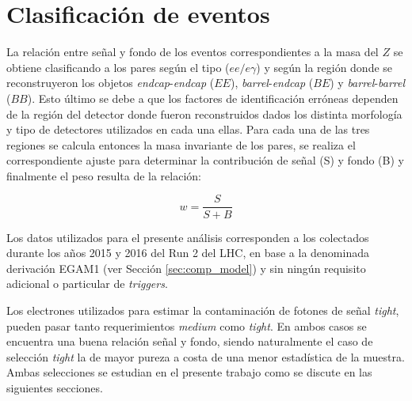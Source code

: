 

\section{Clasificación de eventos}

La relación entre señal y fondo de los eventos correspondientes a la masa del $Z$ se obtiene clasificando a los pares según el tipo ($ee/e\gamma$) y según la región donde se reconstruyeron los objetos \textit{endcap}-\textit{endcap} ($EE$), \textit{barrel}-\textit{endcap} ($BE$) y \textit{barrel}-\textit{barrel} ($BB$). Esto último se debe a que los factores de identificación erróneas dependen de la región del detector donde fueron reconstruidos dados los distinta morfología y tipo de detectores utilizados en cada una ellas. Para cada una de las tres regiones se calcula entonces la masa invariante de los pares, se realiza el correspondiente ajuste para determinar la contribución de señal (S) y fondo (B) y finalmente el peso resulta de la relación:

\begin{equation}
w=\frac{S}{S+B}
\label{eq:peso}
\end{equation}

Los datos utilizados para el presente análisis corresponden a los colectados durante los años 2015 y 2016 del Run 2 del LHC, en base a la denominada derivación EGAM1 (ver Sección \ref{sec:comp_model}) y sin ningún requisito adicional o particular de \textit{triggers}.

Los electrones utilizados para estimar la contaminación de fotones de señal \textit{tight}, pueden pasar tanto requerimientos  \textit{medium} como \textit{tight}. En ambos casos se encuentra una buena relación señal y fondo, siendo naturalmente el caso de selección \textit{tight} la de mayor pureza a costa de una menor estadística de la muestra. Ambas selecciones se estudian en el presente trabajo como se discute en las siguientes secciones.

